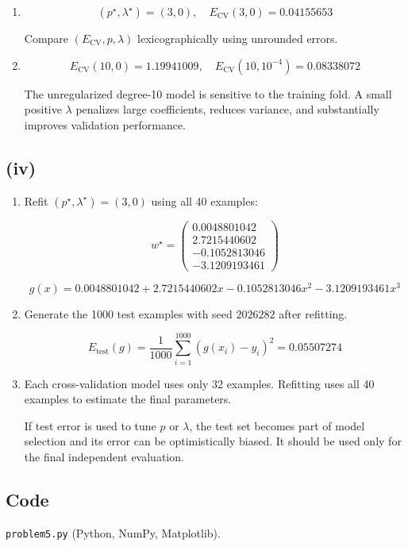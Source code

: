 \documentclass[11pt]{article}
\begin{document}
\begin{enumerate}
    \item[2. ]

    $$
    (p^\star,\lambda^\star) = (3,0)
    ,\quad E_{\text{CV}}(3,0) = 0.04155653
    $$

    Compare $(E_{\text{CV}},p,\lambda)$ lexicographically using unrounded errors.

    \item[3. ]

    $$
    E_{\text{CV}}(10,0) = 1.19941009
    ,\quad
    E_{\text{CV}}(10,10^{-4}) = 0.08338072
    $$

    The unregularized degree-10 model is sensitive to the training fold. A small positive $\lambda$ penalizes large coefficients, reduces variance, and substantially improves validation performance.
\end{enumerate}

\subsection*{(iv)}

\begin{enumerate}
    \item[1. ]

    Refit $(p^\star,\lambda^\star) = (3,0)$ using all 40 examples:

    $$
    w^\star = \begin{pmatrix}
        0.0048801042 \\
        2.7215440602 \\
        -0.1052813046 \\
        -3.1209193461
    \end{pmatrix}
    $$

    $$
    g(x) = 0.0048801042 + 2.7215440602x - 0.1052813046x^2 - 3.1209193461x^3
    $$

    \item[2. ]

    Generate the 1000 test examples with seed $2026282$ after refitting.

    $$
    E_{\text{test}}(g) = \frac{1}{1000}\sum_{i=1}^{1000}(g(x_i)-y_i)^2 = 0.05507274
    $$

    \item[3. ]

    Each cross-validation model uses only 32 examples. Refitting uses all 40 examples to estimate the final parameters.

    If test error is used to tune $p$ or $\lambda$, the test set becomes part of model selection and its error can be optimistically biased. It should be used only for the final independent evaluation.
\end{enumerate}

\newpage

\subsection*{Code}

\texttt{problem5.py} (Python, NumPy, Matplotlib).

\begingroup
\footnotesize

\endgroup
\end{document}
